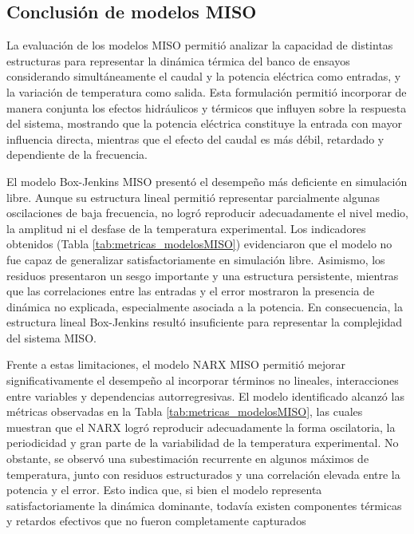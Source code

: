 \documentclass[11pt]{report}
\begin{document}
\subsection{Conclusión de modelos MISO}


La evaluación de los modelos MISO permitió analizar la capacidad de distintas estructuras para representar la dinámica térmica del banco de ensayos considerando simultáneamente el caudal y la potencia eléctrica como entradas, y la variación de temperatura como salida. Esta formulación permitió incorporar de manera conjunta los efectos hidráulicos y térmicos que influyen sobre la respuesta del sistema, mostrando que la potencia eléctrica constituye la entrada con mayor influencia directa, mientras que el efecto del caudal es más débil, retardado y dependiente de la frecuencia.

El modelo Box-Jenkins MISO presentó el desempeño más deficiente en simulación libre. Aunque su estructura lineal permitió representar parcialmente algunas oscilaciones de baja frecuencia, no logró reproducir adecuadamente el nivel medio, la amplitud ni el desfase de la temperatura experimental. Los indicadores obtenidos (Tabla \ref{tab:metricas_modelosMISO}) evidenciaron que el modelo no fue capaz de generalizar satisfactoriamente en simulación libre. Asimismo, los residuos presentaron un sesgo importante y una estructura persistente, mientras que las correlaciones entre las entradas y el error mostraron la presencia de dinámica no explicada, especialmente asociada a la potencia. En consecuencia, la estructura lineal Box-Jenkins resultó insuficiente para representar la complejidad del sistema MISO.


Frente a estas limitaciones, el modelo NARX MISO permitió mejorar significativamente el desempeño al incorporar términos no lineales, interacciones entre variables y dependencias autorregresivas. El modelo identificado alcanzó las métricas observadas en la Tabla \ref{tab:metricas_modelosMISO}, las cuales muestran que el NARX logró reproducir adecuadamente la forma oscilatoria, la periodicidad y gran parte de la variabilidad de la temperatura experimental. No obstante, se observó una subestimación recurrente en algunos máximos de temperatura, junto con residuos estructurados y una correlación elevada entre la potencia y el error. Esto indica que, si bien el modelo representa satisfactoriamente la dinámica dominante, todavía existen componentes térmicas y retardos efectivos que no fueron completamente capturados
\end{document}
